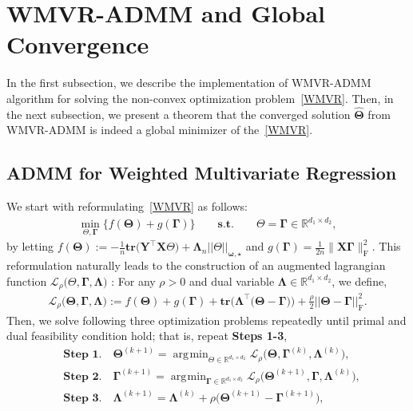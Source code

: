 \documentclass[12pt]{article}
\DeclareMathOperator*{\argmin}{\arg\!\min}
\begin{document}
\section{WMVR-ADMM and Global Convergence}
In the first subsection, we describe the implementation of WMVR-ADMM algorithm for solving the non-convex optimization  problem~\eqref{WMVR}.
Then, in the next subsection, we present a theorem that the converged solution $\widehat{\boldsymbol{\Theta}}$ from WMVR-ADMM is indeed a global minimizer of the~\eqref{WMVR}.

\subsection{ADMM for Weighted Multivariate Regression} \label{WMVR-ADMM}
We start with reformulating~\eqref{WMVR} as follows:
\begin{align} \label{reform}
    \min_{\Theta, \boldsymbol{\Gamma}} \bigg\{ f(\boldsymbol{\Theta}) + g(\boldsymbol{\Gamma}) \bigg\}
    \qquad \textbf{s.t.} \qquad \Theta = \boldsymbol{\Gamma} \in \mathbb{R}^{d_{1}\times d_{2}},
\end{align}
by letting $f(\boldsymbol{\Theta}):=-\frac{1}{n}\textbf{tr}\big( \boldsymbol{Y}^{\top}\boldsymbol{X}\Theta \big)+\boldsymbol{\Lambda}_{n}||\Theta||_{\boldsymbol{\omega,\star}}$ and $g(\boldsymbol{\Gamma})=\frac{1}{2n}\|\boldsymbol{X}\boldsymbol{\Gamma}\|_{\text{F}}^{2}$.
This reformulation naturally leads to the construction of an augmented lagrangian function $\mathcal{L}_{\rho}\big(\Theta,\boldsymbol{\Gamma},\boldsymbol{\Lambda}\big)$ : For any $\rho>0$ and dual variable $\boldsymbol{\Lambda} \in \mathbb{R}^{d_{1}\times d_{2}}$, we define, 
\begin{align*}
    \mathcal{L}_{\rho}\big(\boldsymbol{\Theta},\boldsymbol{\Gamma},\boldsymbol{\Lambda}\big):=
    f(\boldsymbol{\Theta}) + g(\boldsymbol{\Gamma}) + \textbf{tr}\big( \boldsymbol{\Lambda}^{\top}\big( \boldsymbol{\Theta}-\boldsymbol{\Gamma} \big)\big)
    + \frac{\rho}{2} || \boldsymbol{\Theta}-\boldsymbol{\Gamma} ||_{\text{F}}^{2}.
\end{align*}
Then, we solve following three optimization problems repeatedly until primal and dual feasibility condition hold; that is, 
repeat \textbf{Steps 1-3},
\begin{align*}
    &\textbf{Step 1.} \quad \boldsymbol{\Theta}^{(k+1)} = \argmin_{\Theta \in \mathbb{R}^{d_{1} \times d_{2}}} \mathcal{L}_{\rho} \big( \boldsymbol{\Theta},\boldsymbol{\Gamma}^{(k)},\boldsymbol{\Lambda}^{(k)} \big), \\
    &\textbf{Step 2.} \quad \boldsymbol{\Gamma}^{(k+1)} = \argmin_{\boldsymbol{\Gamma} \in \mathbb{R}^{d_{1} \times d_{2}}} \mathcal{L}_{\rho} \big( \boldsymbol{\Theta}^{(k+1)},\boldsymbol{\Gamma},\boldsymbol{\Lambda}^{(k)} \big),  \\
    &\textbf{Step 3.} \quad \boldsymbol{\Lambda}^{(k+1)} = \boldsymbol{\Lambda}^{(k)} + \rho\big( \boldsymbol{\Theta}^{(k+1)}-\boldsymbol{\Gamma}^{(k+1)} \big),
\end{align*}
\end{document}
